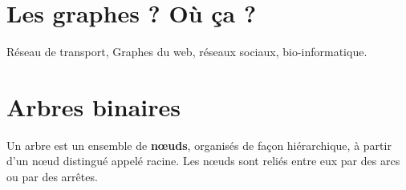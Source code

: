 \section{Les graphes ? Où ça ?}
Réseau de transport, Graphes du web, 
réseaux sociaux, bio-informatique. 

\section{Arbres binaires}

\begin{defi}[Arbres]\cite{ref_01}
Un arbre est un ensemble de \textbf{n\oe{}uds}, organisés de façon hiérarchique, à partir d'un n\oe{}ud distingué appelé racine. Les n\oe{}uds sont reliés entre eux par des arcs ou par des arrêtes. 
\end{defi}


\setlength{\columnseprule}{0pt}

